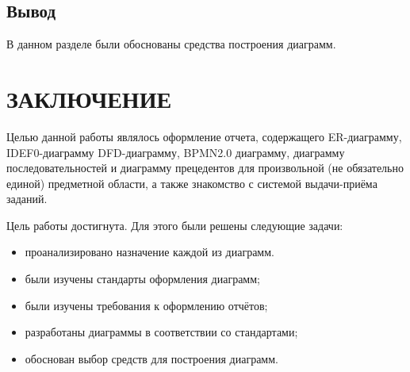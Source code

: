 \documentclass[12pt]{report}
\begin{document}
\section*{Вывод}
В данном разделе были обоснованы средства построения диаграмм.

\chapter*{ЗАКЛЮЧЕНИЕ}
Целью данной работы являлось оформление отчета, содержащего ER-диаграмму, IDEF0-диаграмму DFD-диаграмму, BPMN2.0 диаграмму, диаграмму последовательностей и диаграмму прецедентов для произвольной (не обязательно единой) предметной области, а также знакомство с системой выдачи-приёма заданий. 

Цель работы достигнута. Для этого были решены следующие задачи:
\begin{itemize}
    \item проанализировано назначение каждой из диаграмм.
    \item были изучены стандарты оформления диаграмм;
    \item были изучены требования к оформлению отчётов;
    \item разработаны диаграммы в соответствии со стандартами;
    \item обоснован выбор средств для построения диаграмм.
\end{itemize}

\printbibliography[title={СПИСОК ИСПОЛЬЗОВАННЫХ\\ ИСТОЧНИКОВ}]
\end{document}
